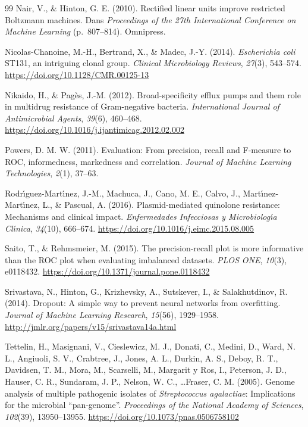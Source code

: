 \documentclass[11pt,a4paper]{article}
\begin{document}
\begin{thebibliography}{99}
Nair, V., \& Hinton, G. E. (2010). Rectified linear units improve restricted Boltzmann machines. Dans \textit{Proceedings of the 27th International Conference on Machine Learning} (p.~807--814). Omnipress.

Nicolas-Chanoine, M.-H., Bertrand, X., \& Madec, J.-Y. (2014). \textit{Escherichia coli} ST131, an intriguing clonal group. \textit{Clinical Microbiology Reviews}, \textit{27}(3), 543--574. \url{https://doi.org/10.1128/CMR.00125-13}

Nikaido, H., \& Pag{\`e}s, J.-M. (2012). Broad-specificity efflux pumps and them role in multidrug resistance of Gram-negative bacteria. \textit{International Journal of Antimicrobial Agents}, \textit{39}(6), 460--468. \url{https://doi.org/10.1016/j.ijantimicag.2012.02.002}

Powers, D. M. W. (2011). Evaluation: From precision, recall and F-measure to ROC, informedness, markedness and correlation. \textit{Journal of Machine Learning Technologies}, \textit{2}(1), 37--63.

Rodr{\'\i}guez-Mart{\'\i}nez, J.-M., Machuca, J., Cano, M. E., Calvo, J., Mart{\'\i}nez-Mart{\'\i}nez, L., \& Pascual, A. (2016). Plasmid-mediated quinolone resistance: Mechanisms and clinical impact. \textit{Enfermedades Infecciosas y Microbiolog{\'\i}a Cl{\'\i}nica}, \textit{34}(10), 666--674. \url{https://doi.org/10.1016/j.eimc.2015.08.005}

Saito, T., \& Rehmsmeier, M. (2015). The precision-recall plot is more informative than the ROC plot when evaluating imbalanced datasets. \textit{PLOS ONE}, \textit{10}(3), e0118432. \url{https://doi.org/10.1371/journal.pone.0118432}

Srivastava, N., Hinton, G., Krizhevsky, A., Sutskever, I., \& Salakhutdinov, R. (2014). Dropout: A simple way to prevent neural networks from overfitting. \textit{Journal of Machine Learning Research}, \textit{15}(56), 1929--1958. \url{http://jmlr.org/papers/v15/srivastava14a.html}

Tettelin, H., Masignani, V., Cieslewicz, M. J., Donati, C., Medini, D., Ward, N. L., Angiuoli, S. V., Crabtree, J., Jones, A. L., Durkin, A. S., Deboy, R. T., Davidsen, T. M., Mora, M., Scarselli, M., Margarit y Ros, I., Peterson, J. D., Hauser, C. R., Sundaram, J. P., Nelson, W. C., \dots Fraser, C. M. (2005). Genome analysis of multiple pathogenic isolates of \textit{Streptococcus agalactiae}: Implications for the microbial ``pan-genome''. \textit{Proceedings of the National Academy of Sciences}, \textit{102}(39), 13950--13955. \url{https://doi.org/10.1073/pnas.0506758102}


\end{thebibliography}
\end{document}
